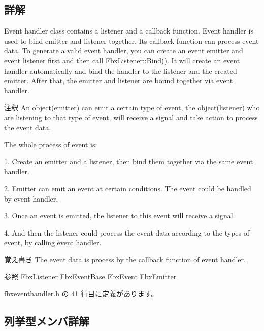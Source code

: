 \subsection{詳解}
Event handler class contains a listener and a callback function. Event handler is used to bind emitter and listener together. Its callback function can process event data. To generate a valid event handler, you can create an event emitter and event listener first and then call \hyperlink{class_fbx_listener_a7a3298b1f4fa347aaa2cb5136265a178}{Fbx\+Listener\+::\+Bind()}. It will create an event handler automatically and bind the handler to the listener and the created emitter. After that, the emitter and listener are bound together via event handler. \begin{DoxyRemark}{注釈}
An object(emitter) can emit a certain type of event, the object(listener) who are listening to that type of event, will receive a signal and take action to process the event data. 
\end{DoxyRemark}
\begin{DoxyParagraph}{The whole process of event is\+:}
\begin{DoxyItemize}
\item 1. Create an emitter and a listener, then bind them together via the same event handler. \item 2. Emitter can emit an event at certain conditions. The event could be handled by event handler. \item 3. Once an event is emitted, the listener to this event will receive a signal. \item 4. And then the listener could process the event data according to the types of event, by calling event handler. \end{DoxyItemize}

\end{DoxyParagraph}
\begin{DoxyNote}{覚え書き}
The event data is process by the callback function of event handler.
\end{DoxyNote}
\begin{DoxySeeAlso}{参照}
\hyperlink{class_fbx_listener}{Fbx\+Listener} \hyperlink{class_fbx_event_base}{Fbx\+Event\+Base} \hyperlink{class_fbx_event}{Fbx\+Event} \hyperlink{class_fbx_emitter}{Fbx\+Emitter} 
\end{DoxySeeAlso}


 fbxeventhandler.\+h の 41 行目に定義があります。



\subsection{列挙型メンバ詳解}
\mbox{\label{class_fbx_event_handler_a47139da2cfd5abee91664d75c4fb577c}} 
